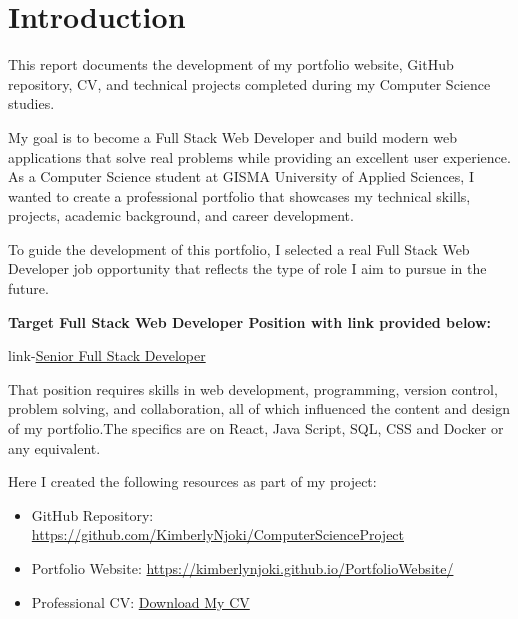 \documentclass[12pt,a4paper]{article}
\begin{document}
\vspace{1cm}

\tableofcontents


\clearpage

\section{Introduction}
\begin{tcolorbox}[
colback=KimPink!5,
colframe=KimPink,
title=About This Report]

This report documents the development of my portfolio website, GitHub repository, CV, and technical projects completed during my Computer Science studies.

\end{tcolorbox}

My goal is to become a Full Stack Web Developer and build modern web applications that solve real problems while providing an excellent user experience. As a Computer Science student at GISMA University of Applied Sciences, I wanted to create a professional portfolio that showcases my technical skills, projects, academic background, and career development.

To guide the development of this portfolio, I selected a real Full Stack Web Developer job opportunity that reflects the type of role I aim to pursue in the future.






\textbf{Target Full Stack Web Developer Position with link provided below:}

link-\href{https://www.linkedin.com/jobs/view/4419844638/?trackingId=PuSz2FWbfsMHEbID0iAecQ%3D%3D&refId=HBHbjzF3obmvOUfJKJ%2FX3A%3D%3D&eBP=NON_CHARGEABLE_CHANNEL&alternateChannel=search&isJobSearch=false&lipi=urn%3Ali%3Apage%3Ad_flagship3_nlsearch_srp_jobs%3B98OjX5xtQEyA8qJpKWoasw%3D%3D}{Senior Full Stack Developer} 

That position requires skills in web development, programming, version control, problem solving, and collaboration, all of which influenced the content and design of my portfolio.The specifics are on React, Java Script, SQL, CSS and Docker or any equivalent.

Here I created the following resources as part of my project:

\begin{itemize}
\item GitHub Repository: \url{https://github.com/KimberlyNjoki/ComputerScienceProject}
\item Portfolio Website: \url{https://kimberlynjoki.github.io/PortfolioWebsite/}

\item Professional CV:
\href{https://raw.githubusercontent.com/KimberlyNjoki/ComputerScienceProject/main/LaTeXCV/LatexCV.pdf}{Download My CV}
\end{itemize}
\end{document}
